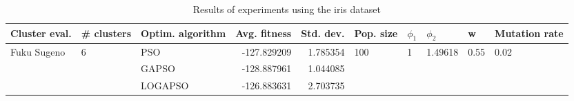 \begin{table}
\centering
\caption{Results of experiments using the iris dataset}
\begin{tabular}{lllrrlllll}
\toprule
               Cluster eval. &        \# clusters & Optim. algorithm &  Avg. fitness &  Std. dev. &            Pop. size &         $\phi_{1}$ &               $\phi_{2}$ &                     w &         Mutation rate \\
\midrule
\multirow{3}{*}{Fuku Sugeno} & \multirow{3}{*}{6} &              PSO &   -127.829209 &   1.785354 & \multirow{3}{*}{100} & \multirow{3}{*}{1} & \multirow{3}{*}{1.49618} & \multirow{3}{*}{0.55} & \multirow{3}{*}{0.02} \\
                             &                    &            GAPSO &   -128.887961 &   1.044085 &                      &                    &                          &                       &                       \\
                             &                    &          LOGAPSO &   -126.883631 &   2.703735 &                      &                    &                          &                       &                       \\
\bottomrule
\end{tabular}
\end{table}
